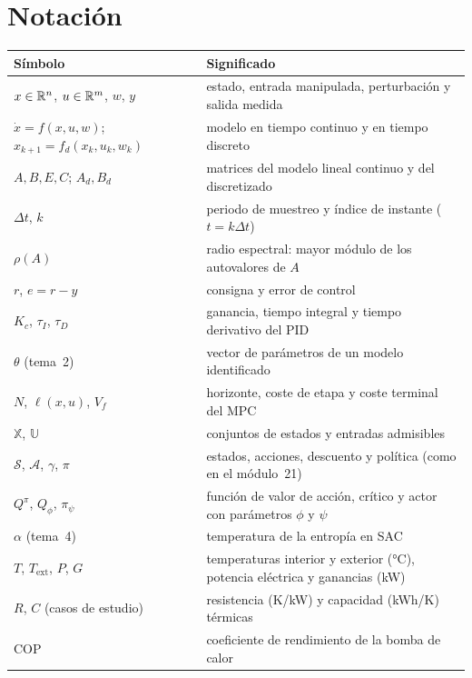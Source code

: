 \documentclass[11pt,a4paper,twoside,openany]{book}
\newcommand{\Sset}{\mathcal{S}}
\newcommand{\Aset}{\mathcal{A}}
\newcommand{\Xset}{\mathbb{X}}
\newcommand{\Uset}{\mathbb{U}}
\newcommand{\Dt}{\Delta t}
\newcommand{\Text}{T_{\mathrm{ext}}}
\newcommand{\COP}{\mathrm{COP}}
\begin{document}
\section*{Notación}
\begin{center}\small
\begin{tabularx}{\textwidth}{@{}l>{\raggedright\arraybackslash}X@{}}
\toprule
Símbolo & Significado \\
\midrule
$x\in\mathbb{R}^{n}$, $u\in\mathbb{R}^{m}$, $w$, $y$ & estado, entrada manipulada, perturbación y salida medida \\
$\dot x=f(x,u,w)$; $x_{k+1}=f_d(x_k,u_k,w_k)$ & modelo en tiempo continuo y en tiempo discreto \\
$A,B,E,C$; $A_d,B_d$ & matrices del modelo lineal continuo y del discretizado \\
$\Dt$, $k$ & periodo de muestreo y índice de instante ($t=k\Dt$) \\
$\rho(A)$ & radio espectral: mayor módulo de los autovalores de $A$ \\
$r$, $e=r-y$ & consigna y error de control \\
$K_c$, $\tau_I$, $\tau_D$ & ganancia, tiempo integral y tiempo derivativo del PID \\
$\theta$ (tema~2) & vector de parámetros de un modelo identificado \\
$N$, $\ell(x,u)$, $V_f$ & horizonte, coste de etapa y coste terminal del MPC \\
$\Xset$, $\Uset$ & conjuntos de estados y entradas admisibles \\
$\Sset$, $\Aset$, $\gamma$, $\pi$ & estados, acciones, descuento y política (como en el módulo~21) \\
$Q^{\pi}$, $Q_\phi$, $\pi_\psi$ & función de valor de acción, crítico y actor con parámetros $\phi$ y $\psi$ \\
$\alpha$ (tema~4) & temperatura de la entropía en SAC \\
$T$, $\Text$, $P$, $G$ & temperaturas interior y exterior (°C), potencia eléctrica y ganancias (kW) \\
$R$, $C$ (casos de estudio) & resistencia (K/kW) y capacidad (kWh/K) térmicas \\
$\COP$ & coeficiente de rendimiento de la bomba de calor \\
\bottomrule
\end{tabularx}
\end{center}

\tableofcontents

\mainmatter







\appendix


\backmatter

\end{document}
